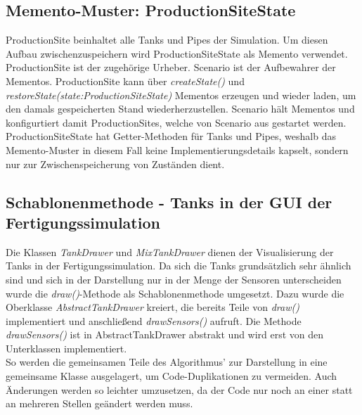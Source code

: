 \documentclass[parskip=full]{scrartcl}
\begin{document}
\subsection{Memento-Muster: ProductionSiteState}
ProductionSite beinhaltet alle Tanks und Pipes der Simulation. Um diesen Aufbau zwischenzuspeichern
wird ProductionSiteState als Memento verwendet. ProductionSite ist der zugehörige Urheber.
Scenario ist der Aufbewahrer der Mementos. ProductionSite kann über \emph{createState()} und \emph{restoreState(state:ProductionSiteState)} Mementos erzeugen und wieder laden,
um den damals gespeicherten Stand wiederherzustellen. Scenario hält Mementos und konfigurtiert damit ProductionSites,
welche von Scenario aus gestartet werden.
ProductionSiteState hat Getter-Methoden für Tanks und Pipes, weshalb das Memento-Muster in diesem Fall keine Implementierungsdetails kapselt, sondern nur zur Zwischenspeicherung von Zuständen dient.

\subsection{Schablonenmethode - Tanks in der GUI der Fertigungssimulation}
Die Klassen \emph{TankDrawer} und \emph{MixTankDrawer} dienen der Visualisierung der Tanks in der Fertigungssimulation. Da sich die Tanks grunds\"atzlich
sehr \"ahnlich sind und sich in der Darstellung nur in der Menge der Sensoren unterscheiden wurde die \emph{draw()}-Methode als Schablonenmethode umgesetzt.
Dazu wurde die Oberklasse \emph{AbstractTankDrawer} kreiert, die bereits Teile von \emph{draw()} implementiert und anschlie{\ss}end \emph{drawSensors()}
aufruft. Die Methode \emph{drawSensors()} ist in AbstractTankDrawer abstrakt und wird erst von den Unterklassen implementiert.\\
So werden die gemeinsamen Teile des Algorithmus' zur Darstellung in eine gemeinsame Klasse ausgelagert, um Code-Duplikationen zu vermeiden. Auch \"Anderungen
werden so leichter umzusetzen, da der Code nur noch an einer statt an mehreren Stellen ge\"andert werden muss.

\pagebreak
{}
{}
\listoffigures
\end{document}
